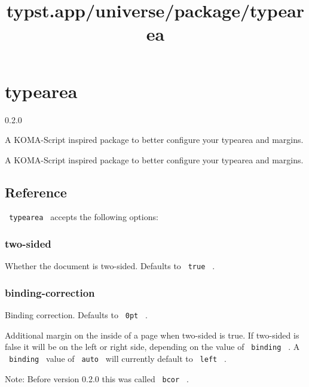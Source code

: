 \title{typst.app/universe/package/typearea}

\label{banner}
\section{typearea}\label{typearea}

{ 0.2.0 }

A KOMA-Script inspired package to better configure your typearea and
margins.

\label{readme}
A KOMA-Script inspired package to better configure your typearea and
margins.

\begin{Shaded}
\begin{Highlighting}[]

\NormalTok{)}

\end{Highlighting}
\end{Shaded}

\subsection{Reference}\label{reference}

\texttt{\ typearea\ } accepts the following options:

\subsubsection{two-sided}\label{two-sided}

Whether the document is two-sided. Defaults to \texttt{\ true\ } .

\subsubsection{binding-correction}\label{binding-correction}

Binding correction. Defaults to \texttt{\ 0pt\ } .

Additional margin on the inside of a page when two-sided is true. If
two-sided is false it will be on the left or right side, depending on
the value of \texttt{\ binding\ } . A \texttt{\ binding\ } value of
\texttt{\ auto\ } will currently default to \texttt{\ left\ } .

Note: Before version 0.2.0 this was called \texttt{\ bcor\ } .

